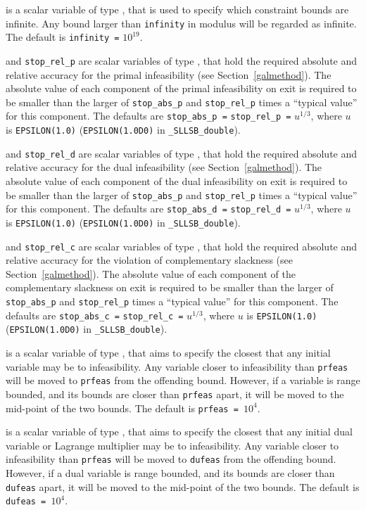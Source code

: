 \documentclass{galahad}
\newcommand{\packagename}{SLLSB}
\newcommand{\fullpackagename}{\libraryname\_\packagename}
\begin{document}
\begin{description}
 is a scalar variable of type \realdp, that is used to
specify which constraint bounds are infinite.
Any bound larger than {\tt infinity} in modulus will be regarded as infinite.
The default is {\tt infinity =} $10^{19}$.

 and {\tt stop\_rel\_p}
are scalar variables of type \realdp, that hold the
required absolute and relative accuracy for the primal infeasibility
(see Section~\ref{galmethod}).
The absolute value of each component of the primal infeasibility
on exit is required to be smaller than the larger of {\tt stop\_abs\_p} and
{\tt stop\_rel\_p} times a ``typical value'' for this component.
The defaults are {\tt stop\_abs\_p =} {\tt stop\_rel\_p =} $u^{1/3}$,
where $u$ is {\tt EPSILON(1.0)} ({\tt EPSILON(1.0D0)} in
{\tt \fullpackagename\_double}).

 and {\tt stop\_rel\_d}
are scalar variables of type \realdp, that hold the
required absolute and relative accuracy for the dual infeasibility
(see Section~\ref{galmethod}).
The absolute value of each component of the dual infeasibility
on exit is required to be smaller than the larger of {\tt stop\_abs\_p} and
{\tt stop\_rel\_p} times a ``typical value'' for this component.
The defaults are {\tt stop\_abs\_d =} {\tt stop\_rel\_d =} $u^{1/3}$,
where $u$ is {\tt EPSILON(1.0)} ({\tt EPSILON(1.0D0)} in
{\tt \fullpackagename\_double}).

 and {\tt stop\_rel\_c}
are scalar variables of type \realdp, that hold the
required absolute and relative accuracy
for the violation of complementary slackness
(see Section~\ref{galmethod}).
The absolute value of each component of the complementary slackness
on exit is required to be smaller than the larger of {\tt stop\_abs\_p} and
{\tt stop\_rel\_p} times a ``typical value'' for this component.
The defaults are {\tt stop\_abs\_c =} {\tt stop\_rel\_c =} $u^{1/3}$,
where $u$ is {\tt EPSILON(1.0)} ({\tt EPSILON(1.0D0)} in
{\tt \fullpackagename\_double}).

 is a scalar variable of type \realdp, that aims to specify
the closest that any initial variable may be to infeasibility. Any variable
closer to infeasibility than {\tt prfeas} will be moved to {\tt prfeas} from
the offending bound. However, if a variable is range bounded, and its bounds
are closer than {\tt prfeas} apart, it will be moved to the mid-point of the
two bounds.
The default is {\tt prfeas = $10^4$}.

 is a scalar variable of type \realdp, that aims to specify
the closest that any initial dual variable or Lagrange multiplier may be to
infeasibility. Any variable closer to infeasibility than {\tt prfeas} will be
moved to {\tt dufeas} from the offending bound. However, if a dual variable
is range bounded, and its bounds are closer than {\tt dufeas} apart, it will
be moved to the mid-point of the two bounds.
The default is {\tt dufeas = $10^4$}.


\end{description}
\end{document}
